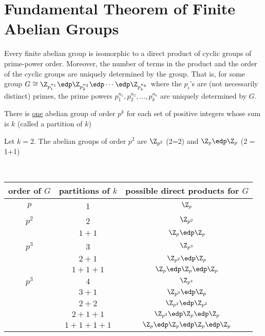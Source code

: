 \section{Fundamental Theorem of Finite Abelian Groups}

\begin{theorem}
    Every finite abelian group is isomorphic to a direct product of cyclic groups of prime-power order. Moreover, the number of terms in the product and the order of the cyclic groups are uniquely determined by the group. That is, for some group \(G\cong \Z_{p_1^{n_1}}\edp \Z_{p_2^{n_2}}\edp\cdots\edp \Z_{p_k^{n_k}}\) where the \(p_i\)'s are (not necessarily distinct) primes, the prime powers \(p_1^{n_1},p_2^{n_2},\ldots,p_k^{n_k}\) are uniquely determined by \(G\).
\end{theorem}


\begin{theorem}
    There is \uline{one} abelian group of order \(p^k\) for each set of positive integers whose sum is \(k\) (called a partition of \(k\))
\end{theorem}

\begin{example}
    Let \(k=2\). The abelian groups of order \(p^2\) are \(\Z_{p^2}\) (2=2) and \(\Z_p\edp\Z_p\) (2 = 1+1)
\end{example}

\begin{example} \
\begin{center}
    \begin{tabular}{|c|c|c|}
        \hline
        order of \(G\)  & partitions of \(k\)   & possible direct products for \(G\) \\ \hline
        \(p\)           & 1                     & \(\Z_{p}\)              \\ \hline
        \(p^2\)         & 2                     & \(\Z_{p^2}\)            \\
                        & $1 + 1$               & \(\Z_{p}\edp\Z_{p}\)  \\ \hline
        \(p^3\)         & 3                     & \(\Z_{p^3}\) \\
                        & $2 + 1$           &  \(\Z_{p^2}\edp \Z_{p}\) \\
                        & \(1+1+1\)         & \(\Z_{p}\edp \Z_{p}\edp \Z_{p}\) \\ \hline
        \(p^3\)         & \(4\)             & \(\Z_{p^4}\) \\
                        & $3 + 1$           &  \(\Z_{p^3}\edp \Z_{p}\) \\
                        & $2 + 2$           &  \(\Z_{p^2}\edp \Z_{p^2}\) \\
                        & $2 + 1 + 1$       &  \(\Z_{p^2}\edp \Z_{p}\edp \Z_p\) \\
                        & \(1+1+1+1\)         & \(\Z_{p}\edp \Z_{p}\edp \Z_{p}\edp \Z_p\) \\ \hline
    \end{tabular}
\end{center}
\end{example}

